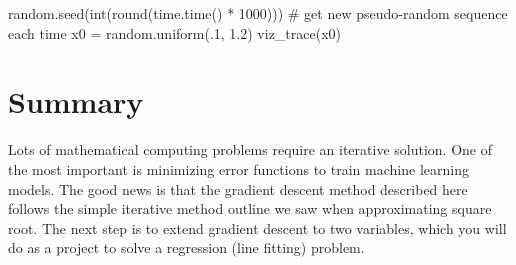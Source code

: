 \documentclass[titlepage]{tufte-book}
\newcounter{problem}
\begin{document}
\begin{fullwidth}
\begin{pyverbatim}
random.seed(int(round(time.time() * 1000))) # get new pseudo-random sequence each time
x0 = random.uniform(.1, 1.2)
viz_trace(x0)
\end{pyverbatim}
 
\section{Summary}

Lots of mathematical computing problems require an iterative solution. One of the most important is minimizing error functions to train machine learning models. The good news is that the gradient descent method described here follows the simple iterative method outline we saw when approximating square root. The next step is to extend gradient descent to two variables, which you will do as a project to solve a regression (line fitting) problem.

\end{fullwidth}
\end{document}
